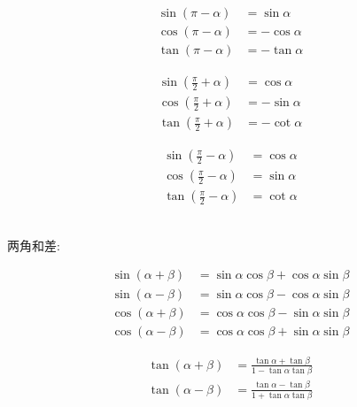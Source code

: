\documentclass[hyperref, UTF8,11pt,a4paper]{ctexart} %
\begin{document}
\begin{figure}[!h] %
	\centering
	\begin{minipage}{170pt}
		$$
			\begin{aligned} \sin (\pi-\alpha) &=\sin \alpha \\ \cos (\pi-\alpha) &=-\cos \alpha \\ \tan (\pi-\alpha) &=-\tan \alpha \end{aligned}
		$$
	\end{minipage}
	\hspace{10pt}
	\begin{minipage}{170pt}
		$$
			\begin{aligned} \sin \left(\frac{\pi}{2}+\alpha\right) &=\cos \alpha \\ \cos \left(\frac{\pi}{2}+\alpha\right) &=-\sin \alpha \\ \tan \left(\frac{\pi}{2}+\alpha\right) &=-\cot \alpha \end{aligned}
		$$
	\end{minipage}
	\hspace{10pt}
	\begin{minipage}{170pt}
		$$
			\begin{aligned} \sin \left(\frac{\pi}{2}-\alpha\right) &=\cos \alpha \\ \cos \left(\frac{\pi}{2}-\alpha\right) &=\sin \alpha \\ \tan \left(\frac{\pi}{2}-\alpha\right) &=\cot \alpha \end{aligned}
		$$
	\end{minipage}
\end{figure}
\\
两角和差:
\begin{figure}[!h] %
	\centering
	\begin{minipage}{170pt}
		$$
			\begin{aligned} \sin (\alpha+\beta) &=\sin \alpha \cos \beta+\cos \alpha \sin \beta \\ \sin (\alpha-\beta) &=\sin \alpha \cos \beta-\cos \alpha \sin \beta \\ \cos (\alpha+\beta) &=\cos \alpha \cos \beta-\sin \alpha \sin \beta \\ \cos (\alpha-\beta) &=\cos \alpha \cos \beta+\sin \alpha \sin \beta \end{aligned}
		$$
	\end{minipage}
	\hspace{10pt}
	\begin{minipage}{170pt}
		$$
			\begin{aligned} \tan (\alpha+\beta) &=\frac{\tan \alpha+\tan \beta}{1-\tan \alpha \tan \beta} \\ \tan (\alpha-\beta) &=\frac{\tan \alpha-\tan \beta}{1+\tan \alpha \tan \beta} \end{aligned}
		$$
	\end{minipage}
	\hspace{10pt}
	\begin{minipage}{170pt}
	\end{minipage}
\end{figure}
\end{document}
